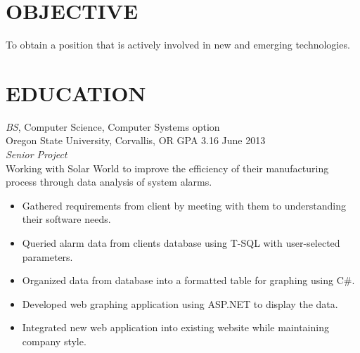 \documentclass{res}
\begin{document}
\thispagestyle{empty} %

\address{1360 NW Van Buren Ave \\ Corvallis, OR 97330\\
  (503) 347-9899\\ jordanmcconnell@comcast.net }



\begin{resume}

\section{OBJECTIVE}
\vspace{8pt} %
To obtain a position that is actively involved in new and emerging technologies.
\vspace{0.2in}
\section{EDUCATION}
\vspace{8pt}
{\sl BS}, Computer Science, Computer Systems option \\
Oregon State University, Corvallis, OR \hspace{0.2in}  GPA 3.16 \hfill June 2013 \\

{\sl Senior Project}\\
Working with Solar World to improve the efficiency of their manufacturing process through data analysis of system alarms.
    \begin{itemize} \itemsep -2pt
    \item Gathered requirements from client by meeting with them to understanding their software needs.
    \item Queried alarm data from clients database using T-SQL with user-selected parameters.
    \item Organized data from database into a formatted table for graphing using C\#.
    \item Developed web graphing application using ASP.NET to display the data.
    \item Integrated new web application into existing website while maintaining company style.
    \end{itemize}


\end{resume}
\end{document}
